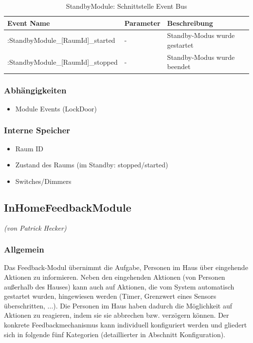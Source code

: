 \begin{table}[H]
	\begin{tabularx}{\textwidth}{
			>{\hsize=1.25\hsize}X %
			>{\hsize=0.5\hsize\centering}X %
			>{\hsize=1.25\hsize}X %
		}
		\hline
		\textbf{Event Name}								& \textbf{Parameter}	& \textbf{Beschreibung} \\
		\hline [DeviceId]:StandbyModule\_[RaumId]\_started	& - 				& Standby-Modus wurde gestartet \\ 
		\hline [DeviceId]:StandbyModule\_[RaumId]\_stopped	& - 				& Standby-Modus wurde beendet \\
		\hline
	\end{tabularx}
	\caption{StandbyModule: Schnittstelle Event Bus}
\end{table}

\subsubsection{Abhängigkeiten}
\begin{itemize}
	\item Module Events (LockDoor)
\end{itemize}

\subsubsection{Interne Speicher}
\begin{itemize}
	\item Raum ID
	\item Zustand des Raums (im Standby: stopped/started)
	\item Switches/Dimmers
\end{itemize}


\subsection{InHomeFeedbackModule}
\emph{(von Patrick Hecker)}
\subsubsection{Allgemein}
Das Feedback-Modul übernimmt die Aufgabe, Personen im Haus über eingehende Aktionen zu informieren. Neben den eingehenden Aktionen (von Personen außerhalb des Hauses) kann auch auf Aktionen, die vom System automatisch gestartet wurden, hingewiesen werden (Timer, Grenzwert eines Sensors überschritten, ...). Die Personen im Haus haben dadurch die Möglichkeit auf Aktionen zu reagieren, indem sie sie abbrechen bzw. verzögern können. Der konkrete Feedbackmechanismus kann individuell konfiguriert werden und gliedert sich in folgende fünf Kategorien (detaillierter in Abschnitt Konfiguration).

